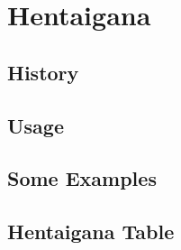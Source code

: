 %
%
\chapter{Hentaigana}\label{chap:Hentaigana}

\section{History}\label{sec:HentaiganaHistory}
\section{Usage}\label{sec:HentaiganaUsage}
\section{Some Examples}\label{sec:HentaiganaSomeExamples}
\section{Hentaigana Table}\label{sec:HentaiganaTable}
\JapaneseFontN %


